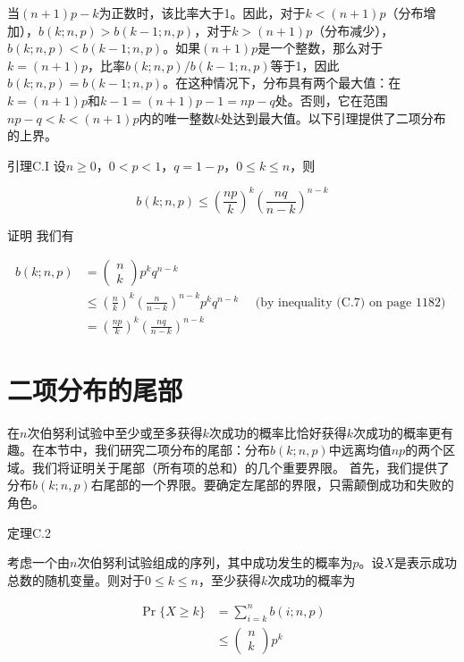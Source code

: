 \documentclass[lang=cn,newtx,10pt,scheme=chinese]{elegantbook}
\begin{document}
当$(n+1)p-k$为正数时，该比率大于1。因此，对于$k<(n+1)p$（分布增加），$b(k;n,p)>b(k-1;n,p)$，对于$k>(n+1)p$（分布减少），$b(k;n,p)<b(k-1;n,p)$。如果$(n+1)p$是一个整数，那么对于$k=(n+1)p$，比率$b(k;n,p)/b(k-1;n,p)$等于1，因此$b(k;n,p)=b(k-1;n,p)$。在这种情况下，分布具有两个最大值：在$k=(n+1)p$和$k-1=(n+1)p-1=n p-q$处。否则，它在范围$n p-q<k<(n+1)p$内的唯一整数$k$处达到最大值。以下引理提供了二项分布的上界。

引理C.I
设$n \geq 0$，$0<p<1$，$q=1-p$，$0 \leq k \leq n$，则

$$
b(k ; n, p) \leq\left(\frac{n p}{k}\right)^k\left(\frac{n q}{n-k}\right)^{n-k}
$$

证明 我们有

$$
\begin{aligned}
b(k ; n, p) & =\left(\begin{array}{l}
n \\
k
\end{array}\right) p^k q^{n-k} \\
& \leq\left(\frac{n}{k}\right)^k\left(\frac{n}{n-k}\right)^{n-k} p^k q^{n-k} \quad \text { (by inequality (C.7) on page 1182) } \\
& =\left(\frac{n p}{k}\right)^k\left(\frac{n q}{n-k}\right)^{n-k}
\end{aligned}
$$

\section{二项分布的尾部}\label{section:C.5}

在$n$次伯努利试验中至少或至多获得$k$次成功的概率比恰好获得$k$次成功的概率更有趣。在本节中，我们研究二项分布的尾部：分布$b(k;n,p)$中远离均值$np$的两个区域。我们将证明关于尾部（所有项的总和）的几个重要界限。
首先，我们提供了分布$b(k;n,p)$右尾部的一个界限。要确定左尾部的界限，只需颠倒成功和失败的角色。

定理C.2

考虑一个由$n$次伯努利试验组成的序列，其中成功发生的概率为$p$。设$X$是表示成功总数的随机变量。则对于$0 \leq k \leq n$，至少获得$k$次成功的概率为

$$
\begin{aligned}
\operatorname{Pr}\{X \geq k\} & =\sum_{i=k}^n b(i ; n, p) \\
& \leq\left(\begin{array}{l}
n \\
k
\end{array}\right) p^k
\end{aligned}
$$
\end{document}
